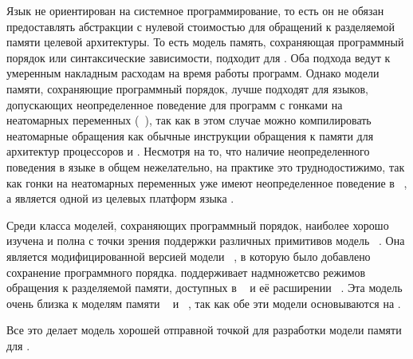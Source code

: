 Язык не ориентирован на системное программирование, 
то есть он не обязан предоставлять абстракции с нулевой стоимостью
для обращений к разделяемой памяти целевой архитектуры. 
То есть модель память, сохраняющая программный порядок 
или синтаксические зависимости, подходит для \Kotlin. 
Оба подхода ведут к умеренным накладным расходам 
на время работы программ. 
Однако модели памяти, сохраняющие программный порядок,
лучше подходят для языков, допускающих неопределенное поведение
для программ с гонками на неатомарных переменных
(\see~\cite{Ou-Demsky:OOPSLA18}), 
так как в этом случае можно компилировать неатомарные обращения
как обычные инструкции обращения к памяти для архитектур процессоров \ARM и \POWER.
Несмотря на то, что наличие неопределенного поведения в языке 
\Kotlin в общем нежелательно, на практике это труднодостижимо, 
так как гонки на неатомарных переменных уже имеют 
неопределенное поведение в \LLVM~\cite{Chakraborty-Vafeiadis:CGO17},
а \LLVM является одной из целевых платформ языка \Kotlin.

Среди класса моделей, сохраняющих программный порядок, наиболее 
хорошо изучена и полна с точки зрения поддержки 
различных примитивов  модель \RCMM~\cite{Lahav-al:PLDI17}. Она  
является  модифицированной версией модели \CMM~\cite{Batty-al:POPL11}, 
в которую было добавлено сохранение программного порядка.
\RCMM поддерживает надмножетсво режимов обращения к разделяемой памяти, 
доступных в \JMM~\cite{Manson-al:POPL05} и её расширении \JAM~\cite{Bender-Palsberg:OOPSLA19}. Эта модель очень близка к моделям памяти 
\JS~\cite{Watt-al:PLDI2020} и \LLVM~\cite{Chakraborty-Vafeiadis:CGO17}, 
так как обе эти модели основываются на  \CMM.

Все это делает модель \RCMM хорошей отправной точкой для разработки модели памяти для \Kotlin.

